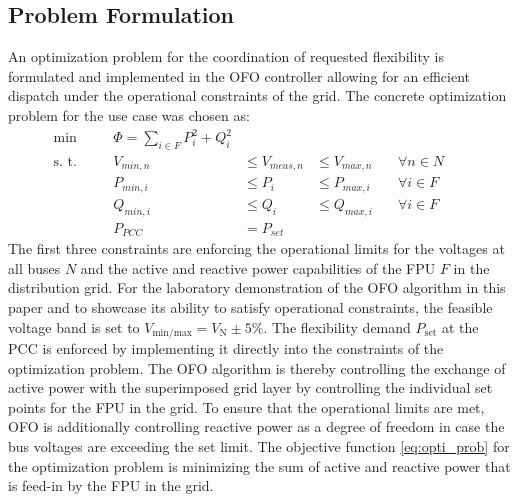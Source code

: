 \documentclass[conference,a4paper]{IEEEtran}
\begin{document}
\subsection{Problem Formulation}
\label{subsec:Form}
An optimization problem for the coordination of requested flexibility is formulated and implemented in the OFO controller allowing for an efficient dispatch under the operational constraints of the grid. The concrete optimization problem for the use case was chosen as:
\begin{equation} \label{eq:opti_prob}
\begin{aligned}
    \min              &\quad&\Phi =  \sum_{i \in F} P_{i}^{2} + Q_{i}^{2}  &&     &&     & \\
    \text{s. t.}       &\quad&   V_{min,n}   &\leq V_{meas,n} & \leq V_{max,n} &\quad \forall n \in N\\
                        &\quad&   P_{min,i}   &\leq P_{i} & \leq P_{max,i} &\quad \forall i \in F\\
                        &\quad&   Q_{min,i}   &\leq Q_{i} & \leq Q_{max,i} &\quad \forall i \in F\\
                        &\quad&  P_{PCC} & =P_{set} &
\end{aligned}
\end{equation}
The first three constraints are enforcing the operational limits for the voltages at all buses $N$ and the active and reactive power capabilities of the FPU $F$ in the distribution grid. For the laboratory demonstration of the OFO algorithm in this paper and to showcase its ability to satisfy operational constraints, the feasible voltage band is set to ${V_{\text{min/max}} = V_{\text{N}} \pm 5\%}$. The flexibility demand $P_{\text{set}}$ at the PCC is enforced by implementing it directly into the constraints of the optimization problem. The OFO algorithm is thereby controlling the exchange of active power with the superimposed grid layer by controlling the individual set points for the FPU in the grid. To ensure that the operational limits are met, OFO is additionally controlling reactive power as a degree of freedom in case the bus voltages are exceeding the set limit. The objective function \eqref{eq:opti_prob} for the optimization problem is minimizing the sum of active and reactive power that is feed-in by the FPU in the grid.
 
\end{document}
